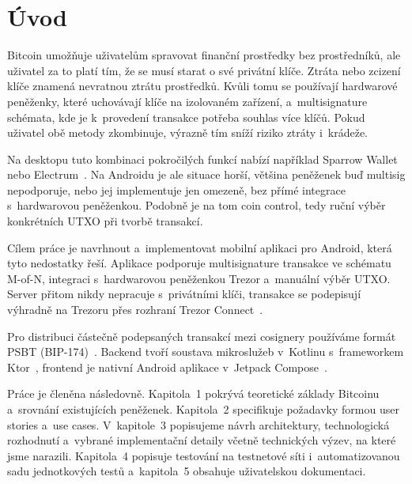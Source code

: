 \chapter*{Úvod}

Bitcoin umožňuje uživatelům spravovat finanční prostředky bez prostředníků,
ale uživatel za to platí tím, že se musí starat o své privátní klíče. Ztráta nebo
zcizení klíče znamená nevratnou ztrátu prostředků. Kvůli tomu se používají
hardwarové peněženky, které uchovávají klíče na izolovaném zařízení,
a~multisignature schémata, kde je k~provedení transakce potřeba souhlas více
klíčů. Pokud uživatel obě metody zkombinuje, výrazně tím sníží riziko ztráty
i~krádeže.

Na desktopu tuto kombinaci pokročilých funkcí nabízí například Sparrow
Wallet~\cite{SparrowWallet} nebo Electrum~\cite{Electrum}. Na Androidu je ale
situace horší, většina peněženek buď multisig nepodporuje, nebo jej
implementuje jen omezeně, bez přímé integrace s~hardwarovou peněženkou.
Podobně je na tom coin control, tedy ruční výběr konkrétních UTXO při tvorbě
transakcí.

Cílem práce je navrhnout a~implementovat mobilní aplikaci pro Android, která
tyto nedostatky řeší. Aplikace podporuje multisignature transakce ve schématu
M-of-N, integraci s~hardwarovou peněženkou Trezor a~manuální výběr UTXO.
Server přitom nikdy nepracuje s~privátními klíči, transakce se podepisují
výhradně na Trezoru přes rozhraní Trezor Connect~\cite{TrezorConnect}.

Pro distribuci částečně podepsaných transakcí mezi cosignery používáme formát
PSBT (BIP-174)~\cite{BIP174}. Backend tvoří soustava mikroslužeb v~Kotlinu
s~frameworkem Ktor~\cite{KtorFramework}, frontend je nativní Android aplikace
v~Jetpack Compose~\cite{JetpackCompose}.

Práce je členěna následovně. Kapitola~1 pokrývá teoretické základy Bitcoinu
a~srovnání existujících peněženek. Kapitola~2 specifikuje požadavky formou
user stories a~use cases. V~kapitole~3 popisujeme návrh architektury,
technologická rozhodnutí a~vybrané implementační detaily včetně technických
výzev, na které jsme narazili. Kapitola~4 popisuje testování na testnetové
síti i~automatizovanou sadu jednotkových testů a~kapitola~5 obsahuje
uživatelskou dokumentaci.
